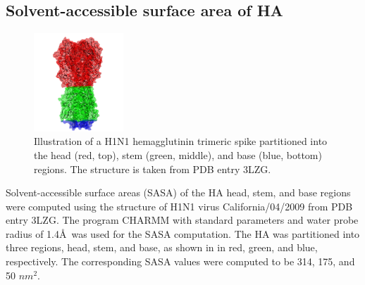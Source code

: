 \vspace{1EM}
\subsection{Solvent-accessible surface area of HA}
\label{sec:sasa}
\begin{figure}
\centering
\includegraphics[width=0.3\textwidth]{fig-h1n1.png}
\caption{
Illustration of a H1N1 hemagglutinin trimeric spike partitioned into the head (red, top), stem (green, middle), and base (blue, bottom) regions.
The structure is taken from PDB entry 3LZG\cite{xu10}.
}
\label{fig:sasa}
\end{figure}
Solvent-accessible surface areas (SASA) of the HA head, stem, and base
regions were computed using the structure of H1N1 virus
California/04/2009 from PDB entry 3LZG.\cite{xu10} The program
CHARMM\cite{Brooks09} with standard parameters\cite{Best12} and water
probe radius of 1.4\AA~was used for the SASA computation. The HA was
partitioned into three regions, head, stem, and base, as shown in
 in red, green, and blue, respectively. The corresponding SASA
values were computed to be 314, 175, and 50 $nm^2$.

